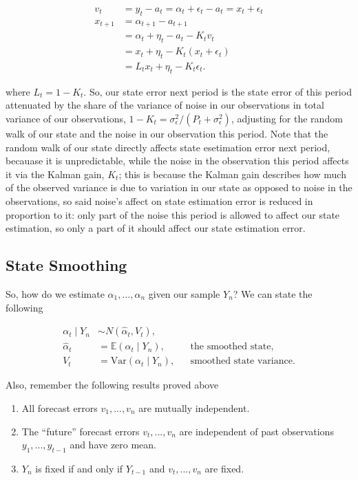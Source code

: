\documentclass{tufte-book}
\begin{document}
\begin{align*}
v_t &= y_t - a_t = \alpha_t + \epsilon_t - a_t = x_t + \epsilon_t \\
x_{t+1} &= \alpha_{t+1} - a_{t+1} \\
&= \alpha_t + \eta_t - a_t - K_t v_t \\
&= x_t + \eta_t - K_t(x_t + \epsilon_t) \\
&= L_t x_t + \eta_t - K_t \epsilon_t.
\end{align*}

\noindent where $L_t = 1- K_t$. So, our state error next period is the state error of this period attenuated by the share of the variance of noise in our observations in total variance of our observations, $1-K_t = \sigma_\epsilon^2/(P_t + \sigma_\epsilon^2)$, adjusting for the random walk of our state and the noise in our observation this period. Note that the random walk of our state directly affects state esetimation error next period, becauase it is unpredictable, while the noise in the observation this period affects it via the Kalman gain, $K_t$; this is because the Kalman gain describes how much of the observed variance is due to variation in our state as opposed to noise in the observations, so said noise's affect on state estimation error is reduced in proportion to it: only part of the noise this period is allowed to affect our state estimation, so only a part of it should affect our state estimation error. 


\subsection{State Smoothing}

So, how do we estimate $\alpha_1, ..., \alpha_n$ given our sample $Y_n$? We can state the following

\begin{align*}
    \alpha_t \mid Y_n &\sim N(\hat{\alpha}_t, V_t), \\
    \hat{\alpha}_t &= \mathbb{E}(\alpha_t \mid Y_n), &&\text{the smoothed state}, \\
    V_t &= \text{Var}(\alpha_t \mid Y_n), && \text{smoothed state variance}.
\end{align*}

\noindent Also, remember the following results proved above

\begin{enumerate}
    \item All forecast errors $v_1, ..., v_n$ are mutually independent.
    \item The ``future'' forecast errors $v_t, ..., v_n$ are independent of past observations $y_1, ..., y_{t-1}$ and have zero mean.
    \item $Y_n$ is fixed if and only if $Y_{t-1}$ and $v_t, ..., v_n$ are fixed.
\end{enumerate}
\end{document}
